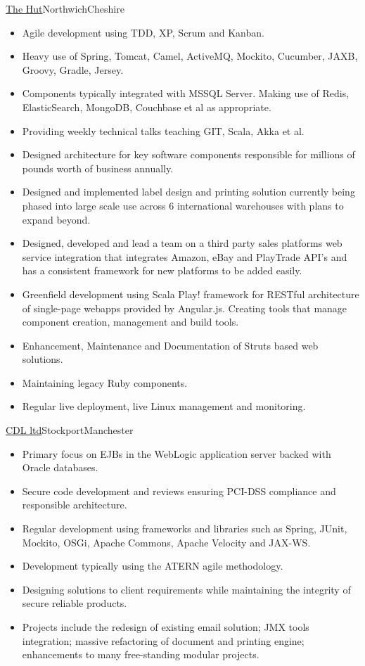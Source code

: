\documentclass[a4paper,10pt]{moderncv}
\newcommand\weblink[2] {{\color{href} \href{#1}{#2}}}
\begin{document}
{\weblink{http://www.thehutgroup.com}{The Hut}}{Northwich}{Cheshire}{
\begin{itemize}
  \item Agile development using TDD, XP, Scrum and Kanban.
  \item Heavy use of Spring, Tomcat, Camel, ActiveMQ, Mockito, Cucumber, JAXB, Groovy, Gradle, Jersey.
  \item Components typically integrated with MSSQL Server. Making use of Redis, ElasticSearch, MongoDB, Couchbase et al as appropriate.
  \item Providing weekly technical talks teaching GIT, Scala, Akka et al.
  \item Designed architecture for key software components responsible for millions of pounds worth of business annually.
  \item Designed and implemented label design and printing solution currently being phased into large scale use across 6 international warehouses with plans to expand beyond.
  \item Designed, developed and lead a team on a third party sales platforms web service integration that integrates Amazon, eBay and PlayTrade API's and has a consistent framework for new platforms to be added easily.
  \item Greenfield development using Scala Play! framework for RESTful architecture of single-page webapps provided by Angular.js. Creating tools that manage component creation, management and build tools.
  \item Enhancement, Maintenance and Documentation of Struts based web solutions.
  \item Maintaining legacy Ruby components.
  \item Regular live deployment, live Linux management and monitoring.
\end{itemize}
}

{\weblink{http://www.cdl.co.uk}{CDL ltd}}{Stockport}{Manchester}{
\begin{itemize}
  \item Primary focus on EJBs in the WebLogic application server backed with Oracle databases.
  \item Secure code development and reviews ensuring PCI-DSS compliance and responsible architecture.
  \item Regular development using frameworks and libraries such as Spring, JUnit, Mockito, OSGi, Apache Commons, Apache Velocity and JAX-WS.
  \item Development typically using the ATERN agile methodology.
  \item Designing solutions to client requirements while maintaining the integrity of secure reliable products.
  \item Projects include the redesign of existing email solution; JMX tools integration; massive refactoring of document and printing engine; enhancements to many free-standing modular projects.
\end{itemize}
}
\end{document}

